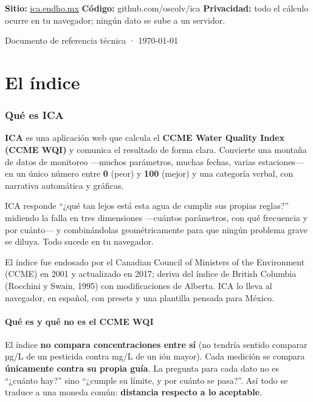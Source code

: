 \documentclass[11pt,a4paper]{article}
\begin{document}
\begin{titlepage}
\vfill
\begin{tcolorbox}[colback=white!55,colframe=white!55,arc=6pt,left=10pt,right=10pt,top=7pt,bottom=7pt]
\small
\textbf{Sitio:} \href{https://ica.endho.mx}{ica.endho.mx} \quad\textbullet\quad
\textbf{Código:} github.com/oscolv/ica \quad\textbullet\quad
\textbf{Privacidad:} todo el cálculo ocurre en tu navegador; ningún dato se sube a un servidor.
\end{tcolorbox}
{\small\color{muted}Documento de referencia técnica · \today}
\end{titlepage}

\tableofcontents
\newpage

\part{El índice}

\section{Qué es ICA}
\textbf{ICA} es una aplicación web que calcula el \textbf{CCME Water Quality Index (CCME WQI)} y comunica
el resultado de forma clara. Convierte una montaña de datos de monitoreo —muchos parámetros, muchas
fechas, varias estaciones— en un único número entre \textbf{0} (peor) y \textbf{100} (mejor) y una
categoría verbal, con narrativa automática y gráficas.

\begin{sitebox}
ICA responde ``¿qué tan lejos está esta agua de cumplir sus propias reglas?'' midiendo la falla en
tres dimensiones —cuántos parámetros, con qué frecuencia y por cuánto— y combinándolas
geométricamente para que ningún problema grave se diluya. Todo sucede en tu navegador.
\end{sitebox}

El índice fue endosado por el Canadian Council of Ministers of the Environment (CCME) en 2001 y
actualizado en 2017; deriva del índice de British Columbia (Rocchini y Swain, 1995) con
modificaciones de Alberta. ICA lo lleva al navegador, en español, con presets y una plantilla
pensada para México.

\subsection{Qué es y qué no es el CCME WQI}
\begin{keybox}
El índice \textbf{no compara concentraciones entre sí} (no tendría sentido comparar µg/L de un
pesticida contra mg/L de un ión mayor). Cada medición se compara \textbf{únicamente contra su propia
guía}. La pregunta para cada dato no es ``¿cuánto hay?'' sino ``¿cumple su límite, y por cuánto se
pasa?''. Así todo se traduce a una moneda común: \textbf{distancia respecto a lo aceptable}.
\end{keybox}
\end{document}
